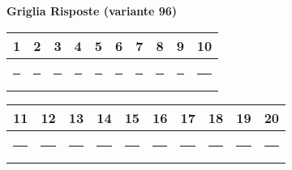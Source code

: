 \documentclass{exam}%
\newcounter{variant}%
\begin{document}
%
\normalsize%
\setcounter{variant}{96}%
\noindent \textbf{  }%
\bigskip%
\noindent\textbf{Griglia Risposte (variante 96)}%
\begin{center}
\begin{tabular}{|c|c|c|c|c|c|c|c|c|c|}
\hline
1 & 2 & 3 & 4 & 5 & 6 & 7 & 8 & 9 & 10 \\ \hline
\rule{1cm}{0pt}\rule[-0.5em]{0pt}{1.5em} & \rule{1cm}{0pt}\rule[-0.5em]{0pt}{1.5em} & \rule{1cm}{0pt}\rule[-0.5em]{0pt}{1.5em} & \rule{1cm}{0pt}\rule[-0.5em]{0pt}{1.5em} & \rule{1cm}{0pt}\rule[-0.5em]{0pt}{1.5em} & \rule{1cm}{0pt}\rule[-0.5em]{0pt}{1.5em} & \rule{1cm}{0pt}\rule[-0.5em]{0pt}{1.5em} & \rule{1cm}{0pt}\rule[-0.5em]{0pt}{1.5em} & \rule{1cm}{0pt}\rule[-0.5em]{0pt}{1.5em} & \rule{1cm}{0pt}\rule[-0.5em]{0pt}{1.5em} \\ \hline
\end{tabular}
\end{center}%
\vspace{0.3em}%
\begin{center}
\begin{tabular}{|c|c|c|c|c|c|c|c|c|c|}
\hline
11 & 12 & 13 & 14 & 15 & 16 & 17 & 18 & 19 & 20 \\ \hline
\rule{1cm}{0pt}\rule[-0.5em]{0pt}{1.5em} & \rule{1cm}{0pt}\rule[-0.5em]{0pt}{1.5em} & \rule{1cm}{0pt}\rule[-0.5em]{0pt}{1.5em} & \rule{1cm}{0pt}\rule[-0.5em]{0pt}{1.5em} & \rule{1cm}{0pt}\rule[-0.5em]{0pt}{1.5em} & \rule{1cm}{0pt}\rule[-0.5em]{0pt}{1.5em} & \rule{1cm}{0pt}\rule[-0.5em]{0pt}{1.5em} & \rule{1cm}{0pt}\rule[-0.5em]{0pt}{1.5em} & \rule{1cm}{0pt}\rule[-0.5em]{0pt}{1.5em} & \rule{1cm}{0pt}\rule[-0.5em]{0pt}{1.5em} \\ \hline
\end{tabular}
\end{center}%
\vspace{1em}%
\end{document}
